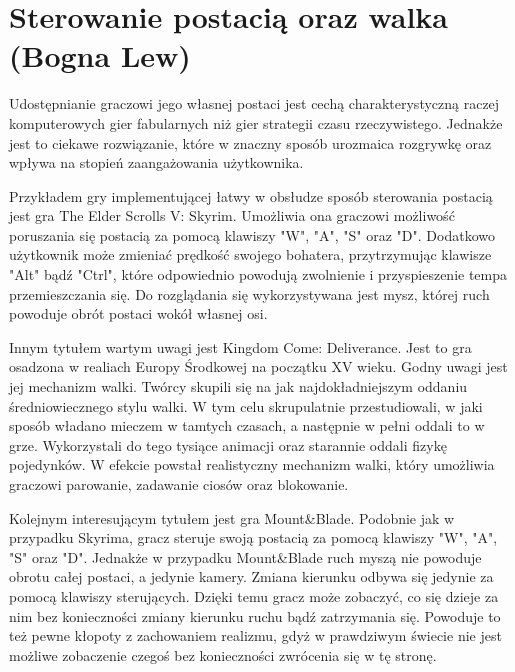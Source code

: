 \section{Sterowanie postacią oraz walka (Bogna Lew)}\label{s:walka}
Udostępnianie graczowi jego własnej postaci jest cechą charakterystyczną raczej komputerowych gier fabularnych niż gier
strategii czasu rzeczywistego. Jednakże jest to ciekawe rozwiązanie, które w znaczny sposób urozmaica rozgrywkę oraz
wpływa na stopień zaangażowania użytkownika.

Przykładem gry implementującej łatwy w obsłudze sposób sterowania postacią jest gra The Elder Scrolls V: Skyrim. Umożliwia
ona graczowi możliwość poruszania się postacią za pomocą klawiszy "W", "A", "S" oraz "D". Dodatkowo użytkownik może
zmieniać prędkość swojego bohatera, przytrzymując klawisze "Alt" bądź "Ctrl", które odpowiednio powodują zwolnienie i
przyspieszenie tempa przemieszczania się. Do rozglądania się wykorzystywana jest mysz, której ruch powoduje obrót postaci
wokół własnej osi.

Innym tytułem wartym uwagi jest Kingdom Come: Deliverance. Jest to gra osadzona w realiach Europy Środkowej na początku
XV wieku. Godny uwagi jest jej mechanizm walki. Twórcy skupili się na jak najdokładniejszym oddaniu średniowiecznego
stylu walki. W tym celu skrupulatnie przestudiowali, w jaki sposób władano mieczem w tamtych czasach, a następnie w
pełni oddali to w grze. Wykorzystali do tego tysiące animacji oraz starannie oddali fizykę pojedynków. W efekcie powstał
realistyczny mechanizm walki, który umożliwia graczowi parowanie, zadawanie ciosów oraz blokowanie.

Kolejnym interesującym tytułem jest gra Mount\&Blade. Podobnie jak w przypadku Skyrima, gracz steruje swoją postacią za
pomocą klawiszy  "W", "A", "S" oraz "D". Jednakże w przypadku Mount\&Blade ruch myszą nie powoduje obrotu całej postaci,
a jedynie kamery. Zmiana kierunku odbywa się jedynie za pomocą klawiszy sterujących. Dzięki temu gracz może zobaczyć, co
się dzieje za nim bez konieczności zmiany kierunku ruchu bądź zatrzymania się. Powoduje to też pewne kłopoty z zachowaniem
realizmu, gdyż w prawdziwym świecie nie jest możliwe zobaczenie czegoś bez konieczności zwrócenia się w tę stronę.